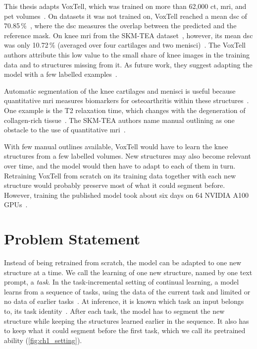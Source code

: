 This thesis adapts VoxTell, which was trained on more than 62{,}000 \gls{ct}, \gls{mri}, and \gls{pet} volumes~\cite{rokuss2025voxtellfreetextpromptableuniversal}.
On datasets it was not trained on, VoxTell reached a mean \gls{dsc} of 70.85\,\%~\cite[Table~1]{rokuss2025voxtellfreetextpromptableuniversal}, where the \gls{dsc} measures the overlap between the predicted and the reference mask.
On knee \gls{mri} from the SKM-TEA dataset~\cite{desai2021skmtea}, however, its mean \gls{dsc} was only 10.72\,\% (averaged over four cartilages and two menisci)~\cite[Suppl.~Table~9]{rokuss2025voxtellfreetextpromptableuniversal}.
The VoxTell authors attribute this low value to the small share of knee images in the training data and to structures missing from it.
As future work, they suggest adapting the model with a few labelled examples~\cite[Sec.~6]{rokuss2025voxtellfreetextpromptableuniversal}.

Automatic segmentation of the knee cartilages and menisci is useful because quantitative \gls{mri} measures biomarkers for osteoarthritis within these structures~\cite{desai2021skmtea}.
One example is the T2 relaxation time, which changes with the degeneration of collagen-rich tissue~\cite[Sec.~2]{desai2021skmtea}.
The SKM-TEA authors name manual outlining as one obstacle to the use of quantitative \gls{mri}~\cite[Sec.~2]{desai2021skmtea}.

With few manual outlines available, VoxTell would have to learn the knee structures from a few labelled volumes.
New structures may also become relevant over time, and the model would then have to adapt to each of them in turn.
Retraining VoxTell from scratch on its training data together with each new structure would probably preserve most of what it could segment before.
However, training the published model took about six days on 64 NVIDIA A100 GPUs~\cite[Sec.~5]{rokuss2025voxtellfreetextpromptableuniversal}.

\section{Problem Statement}
\label{sec:intro-problem}

Instead of being retrained from scratch, the model can be adapted to one new structure at a time.
We call the learning of one new structure, named by one text prompt, a \emph{task}.
In the task-incremental setting of continual learning, a model learns from a sequence of tasks, using the data of the current task and limited or no data of earlier tasks~\cite[Sec.~2]{delange2022}.
At inference, it is known which task an input belongs to, its task identity~\cite[Sec.~1]{delange2022}.
After each task, the model has to segment the new structure while keeping the structures learned earlier in the sequence.
It also has to keep what it could segment before the first task, which we call its pretrained ability (\cref{fig:ch1_setting}).

